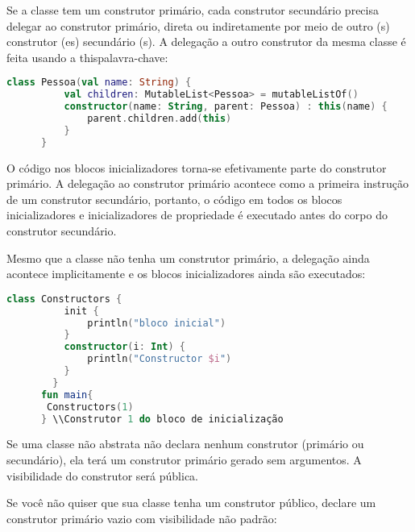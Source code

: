 Se a classe tem um construtor primário, cada 
construtor secundário precisa delegar ao construtor
primário, direta ou indiretamente por meio de outro (s) construtor (es) secundário (s). A delegação a outro construtor da mesma classe é feita usando a thispalavra-chave:
\begin{lstlisting}[label={lst:example1}, language=Kotlin]
        class Pessoa(val name: String) {
          val children: MutableList<Pessoa> = mutableListOf()
          constructor(name: String, parent: Pessoa) : this(name) {
              parent.children.add(this)
          }
      }
      \end{lstlisting}
O código nos blocos inicializadores torna-se efetivamente parte do construtor primário. 
A delegação ao construtor primário acontece como a primeira instrução de um construtor 
secundário, portanto, o código em todos os blocos inicializadores e inicializadores de propriedade
é executado antes do corpo do construtor secundário.

Mesmo que a classe não tenha um construtor primário, a delegação ainda acontece implicitamente e os blocos inicializadores ainda são executados:
\begin{lstlisting}[label={lst:example1}, language=Kotlin]
        class Constructors {
          init {
              println("bloco inicial")
          }
          constructor(i: Int) {
              println("Constructor $i")
          }
        }
      fun main{
       Constructors(1)
      } \\Construtor 1 do bloco de inicialização
      \end{lstlisting}

Se uma classe não abstrata não declara nenhum construtor (primário ou secundário), ela terá um construtor primário gerado sem argumentos. A visibilidade do construtor será pública.

Se você não quiser que sua classe tenha um construtor público, declare um construtor primário vazio com visibilidade não padrão:











